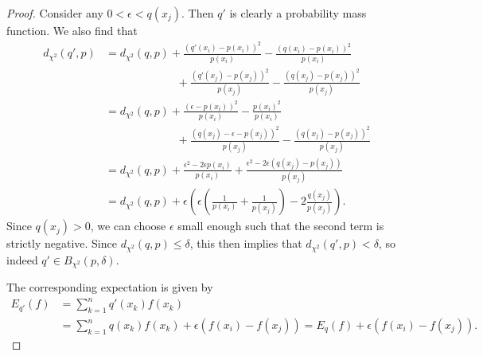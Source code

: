 \documentclass{article}
\begin{document}
\begin{proof}
Consider any $0<\epsilon<q(x_j)$. Then $q'$ is clearly a probability mass function. We also find that
\begin{align*}
d_{\chi^2}(q',p)
&=d_{\chi^2}(q,p)+\frac{(q'(x_i)-p(x_i))^2}{p(x_i)}-\frac{(q(x_i)-p(x_i))^2}{p(x_i)}\\
&~~~~~~~~~~~~~~~~~~~~~~~~~~~~~+\frac{(q'(x_j)-p(x_j))^2}{p(x_j)}-\frac{(q(x_j)-p(x_j))^2}{p(x_j)}\\
&=d_{\chi^2}(q,p)+\frac{(\epsilon-p(x_i))^2}{p(x_i)}-\frac{p(x_i)^2}{p(x_i)}\\
&~~~~~~~~~~~~~~~~~~~~~~~~~~~~~+\frac{(q(x_j)-\epsilon-p(x_j))^2}{p(x_j)}-\frac{(q(x_j)-p(x_j))^2}{p(x_j)}\\
&=d_{\chi^2}(q,p)+\frac{\epsilon^2-2\epsilon p(x_i)}{p(x_i)}+\frac{\epsilon^2-2\epsilon(q(x_j)-p(x_j))}{p(x_j)}\\
&=d_{\chi^2}(q,p)+\epsilon\left(\epsilon\left(\frac{1}{p(x_i)}+\frac{1}{p(x_j)}\right)-2\frac{q(x_j)}{p(x_j)}\right).
\end{align*}
Since $q(x_j)>0$, we can choose $\epsilon$ small enough such that the second term is strictly negative. Since $d_{\chi^2}(q,p)\leq\delta$, this then implies that $d_{\chi^2}(q',p)<\delta$, so indeed $q'\in B_{\chi^2}(p,\delta)$.

The corresponding expectation is given by
\begin{align*}
E_{q'}(f)&=\sum_{k=1}^n q'(x_k)f(x_k)\\
&=\sum_{k=1}^n q(x_k)f(x_k)+\epsilon(f(x_i)-f(x_j))
=E_q(f)+\epsilon(f(x_i)-f(x_j)).
\end{align*}
\end{proof}
\end{document}
